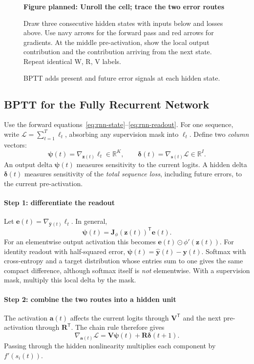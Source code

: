 \documentclass[11pt, oneside]{book}
\newcommand{\R}{\mathbb{R}}
\newcommand{\T}{^{\mathsf{T}}}           %
\newcommand{\loss}{\mathcal{L}}          %
\newcommand{\params}{\boldsymbol{\theta}}   %
\let\originalsubsection\subsection
\renewcommand{\subsection}{\Needspace{6\baselineskip}\originalsubsection}
\newcommand{\figureplaceholder}[5]{%
\begin{figure}[htbp]
\centering
\begin{tcolorbox}[unbreakable,width=\linewidth,height=#1,colback=accent!3,
  colframe=accent!30,boxrule=0.5pt,arc=2.5mm,sharp corners=all,
  valign=center,halign=center,fontupper=\small]
{\bfseries\color{accent}Figure planned: #2}\par\medskip
{\color{gray!75!black}#3}
\end{tcolorbox}
\caption{#4}\label{#5}
\end{figure}}
\begin{document}
\figureplaceholder{3.4cm}{Unroll the cell; trace the two error routes}{Draw three consecutive hidden states with inputs below and losses above. Use navy arrows for the forward pass and red arrows for gradients. At the middle pre-activation, show the local output contribution and the contribution arriving from the next state. Repeat identical W, R, V labels.}{BPTT adds present and future error signals at each hidden state.}{fig:bptt-flow}

\subsection{BPTT for the Fully Recurrent Network}\label{sec:source-2-2-1}
Use the forward equations~\eqref{eq:rnn-state}--\eqref{eq:rnn-readout}. For one sequence, write $\loss=\sum_{t=1}^T\ell_t$, absorbing any supervision mask into $\ell_t$. Define two \emph{column} vectors:
\[
 \boldsymbol{\psi}(t)=\nabla_{\mathbf{z}(t)}\ell_t\in\R^K,
 \qquad
 \boldsymbol{\delta}(t)=\nabla_{\mathbf{s}(t)}\loss\in\R^I.
\]
An output delta $\boldsymbol{\psi}(t)$ measures sensitivity to the current logits. A hidden delta $\boldsymbol{\delta}(t)$ measures sensitivity of the \emph{total sequence loss}, including future errors, to the current pre-activation.

\paragraph{Step 1: differentiate the readout} Let $\mathbf{e}(t)=\nabla_{\widehat{\mathbf{y}}(t)}\ell_t$. In general,
\[
 \boldsymbol{\psi}(t)=\mathbf{J}_{\phi}(\mathbf{z}(t))\T\mathbf{e}(t).
\]
For an elementwise output activation this becomes $\mathbf{e}(t)\odot\phi'(\mathbf{z}(t))$. For identity readout with half-squared error, $\boldsymbol{\psi}(t)=\widehat{\mathbf{y}}(t)-\mathbf{y}(t)$. Softmax with cross-entropy and a target distribution whose entries sum to one gives the same compact difference, although softmax itself is \emph{not} elementwise. With a supervision mask, multiply this local delta by the mask.

\paragraph{Step 2: combine the two routes into a hidden unit} The activation $\mathbf{a}(t)$ affects the current logits through $\mathbf{V}\T$ and the next pre-activation through $\mathbf{R}\T$. The chain rule therefore gives
\[
 \nabla_{\mathbf{a}(t)}\loss
   =\mathbf{V}\boldsymbol{\psi}(t)+\mathbf{R}\boldsymbol{\delta}(t+1).
\]
Passing through the hidden nonlinearity multiplies each component by $f'(s_i(t))$.
\end{document}
